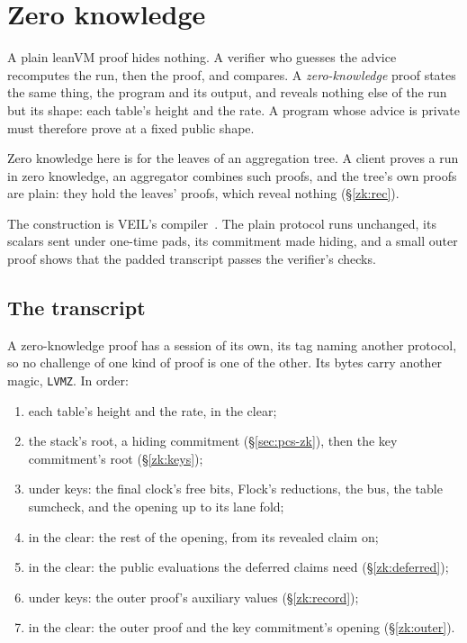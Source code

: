 \section{Zero knowledge}\label{annex:zk}

A plain leanVM proof hides nothing. A verifier who guesses the advice recomputes the run, then the proof, and compares. A \emph{zero-knowledge} proof states the same thing, the program and its output, and reveals nothing else of the run but its shape: each table's height and the rate. A program whose advice is private must therefore prove at a fixed public shape.

Zero knowledge here is for the leaves of an aggregation tree. A client proves a run in zero knowledge, an aggregator combines such proofs, and the tree's own proofs are plain: they hold the leaves' proofs, which reveal nothing (\S\ref{zk:rec}).

The construction is VEIL's compiler~\cite{DHRR26}. The plain protocol runs unchanged, its scalars sent under one-time pads, its commitment made hiding, and a small outer proof shows that the padded transcript passes the verifier's checks.

\subsection{The transcript}\label{zk:transcript}

A zero-knowledge proof has a session of its own, its tag naming another protocol, so no challenge of one kind of proof is one of the other. Its bytes carry another magic, \texttt{LVMZ}. In order:
\begin{enumerate}[itemsep=1pt,topsep=2pt]
\item each table's height and the rate, in the clear;
\item the stack's root, a hiding commitment (\S\ref{sec:pcs-zk}), then the key commitment's root (\S\ref{zk:keys});
\item under keys: the final clock's free bits, Flock's reductions, the bus, the table sumcheck, and the opening up to its lane fold;
\item in the clear: the rest of the opening, from its revealed claim on;
\item in the clear: the public evaluations the deferred claims need (\S\ref{zk:deferred});
\item under keys: the outer proof's auxiliary values (\S\ref{zk:record});
\item in the clear: the outer proof and the key commitment's opening (\S\ref{zk:outer}).
\end{enumerate}

